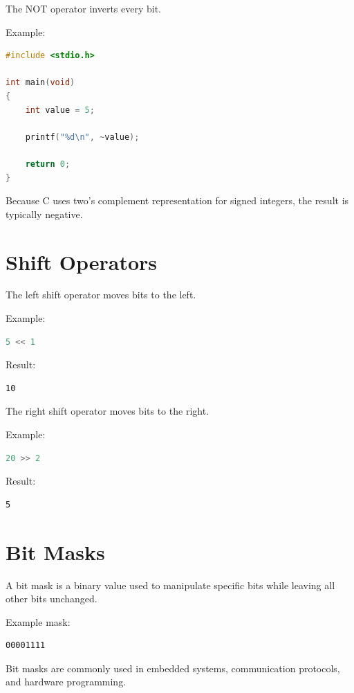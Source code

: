 \documentclass[12pt,openany]{book}
\begin{document}
The NOT operator inverts every bit.

Example:

\begin{lstlisting}[language=C]
#include <stdio.h>

int main(void)
{
    int value = 5;

    printf("%d\n", ~value);

    return 0;
}
\end{lstlisting}

Because C uses two's complement representation for signed integers, the result is typically negative.

\section{Shift Operators}

The left shift operator moves bits to the left.

Example:

\begin{lstlisting}[language=C]
5 << 1
\end{lstlisting}

Result:

\begin{lstlisting}
10
\end{lstlisting}

The right shift operator moves bits to the right.

Example:

\begin{lstlisting}[language=C]
20 >> 2
\end{lstlisting}

Result:

\begin{lstlisting}
5
\end{lstlisting}
\section{Bit Masks}

A bit mask is a binary value used to manipulate specific bits while leaving all other bits unchanged.

Example mask:

\begin{lstlisting}
00001111
\end{lstlisting}

Bit masks are commonly used in embedded systems, communication protocols, and hardware programming.
\end{document}
